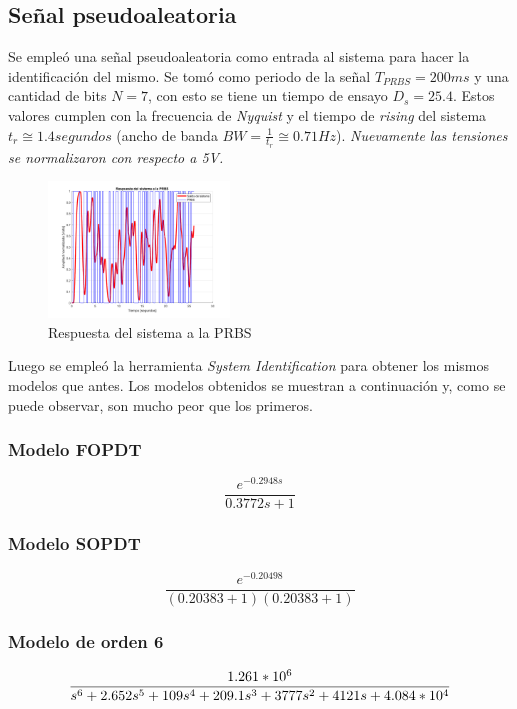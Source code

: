 \documentclass[letterpaper, 10 pt, conference]{ieeeconf}  %
\begin{document}
\subsection{Señal pseudoaleatoria}

Se empleó una señal pseudoaleatoria como entrada al sistema para hacer la identificación del mismo. Se tomó como periodo de la señal $T_{PRBS} = 200ms$ y una cantidad de bits $N=7$, con esto se tiene un tiempo de ensayo $D_s = 25.4$. Estos valores cumplen con la frecuencia de \textit{Nyquist} y el tiempo de \textit{rising} del sistema $t_{r} \cong 1.4segundos$ (ancho de banda $BW = \frac{1}{t_{r}} \cong 0.71Hz$).
\textit{Nuevamente las tensiones se normalizaron con respecto a 5V.}

\begin{figure}[htpb]
  \centering
  \includegraphics[width=0.43\textwidth]{./IMAGENES/datos_prbs.png}
  \caption{Respuesta del sistema a la PRBS}
  \label{fig:datos_prbs}
\end{figure}

Luego se empleó la herramienta \textit{System Identification} para obtener los mismos modelos que antes. Los modelos obtenidos se muestran a continuación y, como se puede observar, son mucho peor que los primeros.

\subsubsection{Modelo FOPDT}
\begin{equation}
  \frac{e^{-0.2948s}}{0.3772s+1}
\end{equation}

\subsubsection{Modelo SOPDT}
\begin{equation}
  \frac{e^{-0.20498}}{(0.20383+1)(0.20383+1)}
\end{equation}

\subsubsection{Modelo de orden 6}
\begin{equation}
  \tiny{\frac{1.261*10^6}{s^6 + 2.652 s^5 + 109 s^4 + 209.1 s^3 + 3777 s^2 + 4121 s + 4.084*10^{4}}}
\end{equation}
\end{document}
